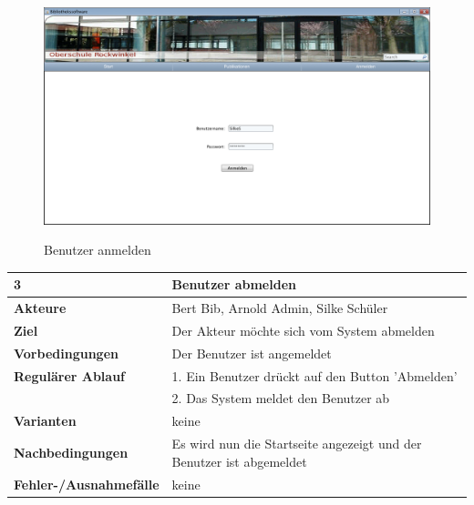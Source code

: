 \documentclass[fontsize=12pt,paper=a4,twoside]{scrartcl}
\begin{document}
\begin{figure}[htbp]
\caption{Benutzer anmelden}
\includegraphics[width=1\textwidth]{ScreensWebsite/LoginSchueler.png}
\label{Benutzer anmelden}
\end{figure}

\begin{table}[htbp]
\label{3}
\begin{tabular}{|l|p{10cm}|}
\hline 
\textbf{3} & \textbf{Benutzer abmelden} \\ \hline
\textbf{Akteure} & Bert Bib, Arnold Admin, Silke Schüler \\ \hline
\textbf{Ziel} & Der Akteur möchte sich vom System abmelden  \\ \hline
\textbf{Vorbedingungen} & Der Benutzer ist angemeldet  \\ \hline
\textbf{Regulärer Ablauf} & 
1. Ein Benutzer drückt auf den Button 'Abmelden' \\
&2. Das System meldet den Benutzer ab\\
\hline
\textbf{Varianten} & 
keine \\ \hline
\textbf{Nachbedingungen} & Es wird nun die Startseite angezeigt und der Benutzer ist abgemeldet\\
\hline
\textbf{Fehler-/Ausnahmefälle} & keine\\\hline
\end{tabular}
\end{table}
\end{document}
